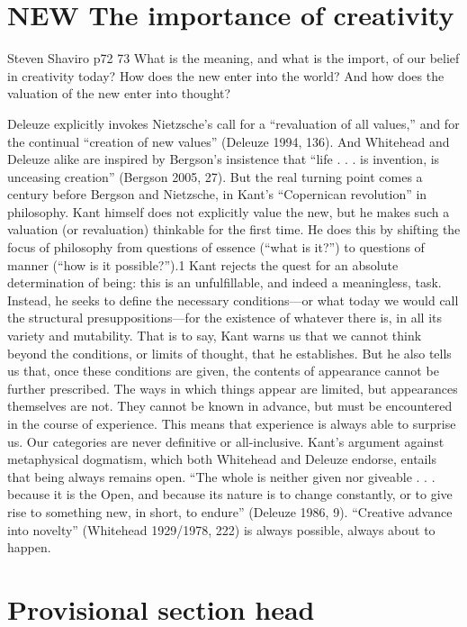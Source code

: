 \section{NEW The importance of creativity}
Steven Shaviro
p72 73
What is the meaning, and what is the import, of our belief in creativity
today?
How does the new enter into the world? 
And how does the valuation
of the new enter into thought? 

Deleuze explicitly invokes Nietzsche’s call for a
“revaluation of all values,” and for the continual “creation of new values”
(Deleuze 1994, 136). And Whitehead and Deleuze alike are inspired by
Bergson’s insistence that “life . . . is invention, is unceasing creation” (Bergson
2005, 27). But the real turning point comes a century before Bergson and
Nietzsche, in Kant’s “Copernican revolution” in philosophy. Kant himself
does not explicitly value the new, but he makes such a valuation (or revaluation)
thinkable for the first time. He does this by shifting the focus of philosophy
from questions of essence (“what is it?”) to questions of manner (“how
is it possible?”).1 Kant rejects the quest for an absolute determination of being:
this is an unfulfillable, and indeed a meaningless, task. Instead, he seeks
to define the necessary conditions—or what today we would call the structural
presuppositions—for the existence of whatever there is, in all its variety
and mutability. That is to say, Kant warns us that we cannot think beyond the
conditions, or limits of thought, that he establishes. But he also tells us that,
once these conditions are given, the contents of appearance cannot be further
prescribed. The ways in which things appear are limited, but appearances
themselves are not. They cannot be known in advance, but must be encountered
in the course of experience. This means that experience is always able to
surprise us. Our categories are never definitive or all-inclusive. Kant’s argument
against metaphysical dogmatism, which both Whitehead and Deleuze
endorse, entails that being always remains open. “The whole is neither given
nor giveable . . . because it is the Open, and because its nature is to change
constantly, or to give rise to something new, in short, to endure” (Deleuze
1986, 9). “Creative advance into novelty” (Whitehead 1929/1978, 222) is always
possible, always about to happen.



\section{Provisional section head}


